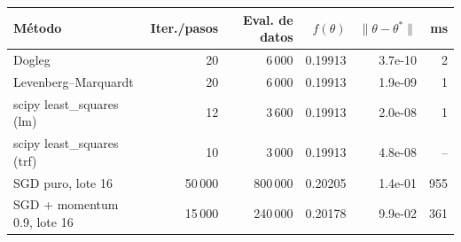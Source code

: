\begin{tabular}{lrrrrr}\toprule
M\'etodo & Iter./pasos & Eval. de datos & $f(\theta)$ & $\|\theta-\theta^\ast\|$ & ms \\\midrule
Dogleg & 20 & 6\,000 & 0.19913 & 3.7e-10 & 2 \\
Levenberg--Marquardt & 20 & 6\,000 & 0.19913 & 1.9e-09 & 1 \\
scipy least\_squares (lm) & 12 & 3\,600 & 0.19913 & 2.0e-08 & 1 \\
scipy least\_squares (trf) & 10 & 3\,000 & 0.19913 & 4.8e-08 & -- \\
SGD puro, lote 16 & 50\,000 & 800\,000 & 0.20205 & 1.4e-01 & 955 \\
SGD + momentum 0.9, lote 16 & 15\,000 & 240\,000 & 0.20178 & 9.9e-02 & 361 \\
\bottomrule\end{tabular}
